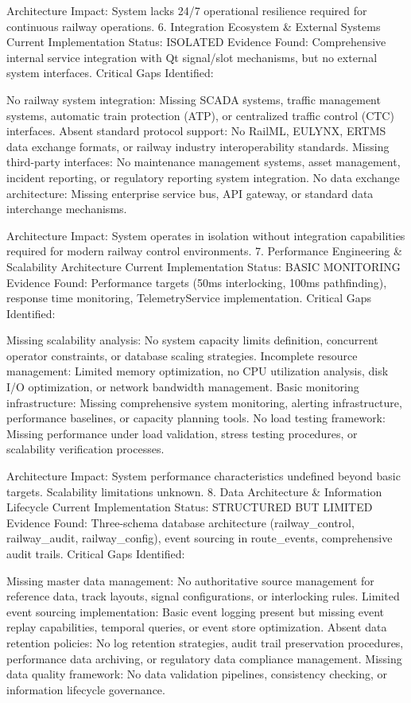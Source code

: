Architecture Impact: System lacks 24/7 operational resilience required for continuous railway operations.
6. Integration Ecosystem & External Systems
Current Implementation Status: ISOLATED
Evidence Found: Comprehensive internal service integration with Qt signal/slot mechanisms, but no external system interfaces.
Critical Gaps Identified:

No railway system integration: Missing SCADA systems, traffic management systems, automatic train protection (ATP), or centralized traffic control (CTC) interfaces.
Absent standard protocol support: No RailML, EULYNX, ERTMS data exchange formats, or railway industry interoperability standards.
Missing third-party interfaces: No maintenance management systems, asset management, incident reporting, or regulatory reporting system integration.
No data exchange architecture: Missing enterprise service bus, API gateway, or standard data interchange mechanisms.

Architecture Impact: System operates in isolation without integration capabilities required for modern railway control environments.
7. Performance Engineering & Scalability Architecture
Current Implementation Status: BASIC MONITORING
Evidence Found: Performance targets (50ms interlocking, 100ms pathfinding), response time monitoring, TelemetryService implementation.
Critical Gaps Identified:

Missing scalability analysis: No system capacity limits definition, concurrent operator constraints, or database scaling strategies.
Incomplete resource management: Limited memory optimization, no CPU utilization analysis, disk I/O optimization, or network bandwidth management.
Basic monitoring infrastructure: Missing comprehensive system monitoring, alerting infrastructure, performance baselines, or capacity planning tools.
No load testing framework: Missing performance under load validation, stress testing procedures, or scalability verification processes.

Architecture Impact: System performance characteristics undefined beyond basic targets. Scalability limitations unknown.
8. Data Architecture & Information Lifecycle
Current Implementation Status: STRUCTURED BUT LIMITED
Evidence Found: Three-schema database architecture (railway_control, railway_audit, railway_config), event sourcing in route_events, comprehensive audit trails.
Critical Gaps Identified:

Missing master data management: No authoritative source management for reference data, track layouts, signal configurations, or interlocking rules.
Limited event sourcing implementation: Basic event logging present but missing event replay capabilities, temporal queries, or event store optimization.
Absent data retention policies: No log retention strategies, audit trail preservation procedures, performance data archiving, or regulatory data compliance management.
Missing data quality framework: No data validation pipelines, consistency checking, or information lifecycle governance.

